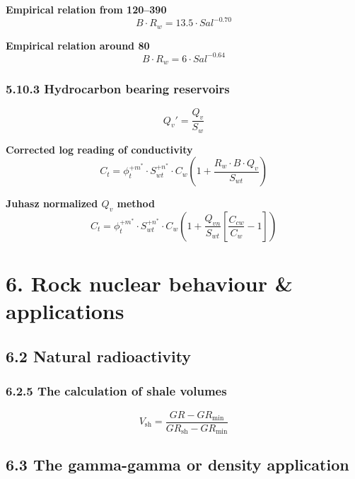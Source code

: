 \textbf{Empirical relation from \SIrange{120}{390}{\fahrenheit}}
\begin{equation*}
    B\cdot R_w = 13.5\cdot \mathit{Sal}^{-0.70}\tag{5.29}
\end{equation*}

\textbf{Empirical relation around \SI{80}{\fahrenheit}}
\begin{equation*}
    B\cdot R_w = 6\cdot \mathit{Sal}^{-0.64}\tag{5.30}
\end{equation*}

\subsubsection{5.10.3 Hydrocarbon bearing reservoirs}
\begin{equation*}
    Q_v' = \frac{Q_v}{S_w}\tag{5.31}
\end{equation*}

\textbf{Corrected log reading of conductivity}
\begin{equation*}
    C_t = \phi_t^{+m^\ast}\cdot S_{wt}^{+n^\ast}\cdot C_w\left( 1 + \frac{R_w\cdot B\cdot Q_v}{S_{wt}} \right)\tag{5.32}
\end{equation*}

\textbf{Juhasz normalized $Q_v$ method}
\begin{equation*}
    C_t = \phi_t^{+m^\ast}\cdot S_{wt}^{+n^\ast}\cdot C_w\left( 1 + \frac{Q_{vn}}{S_{wt}}\left[ \frac{C_{cw}}{C_w} - 1 \right] \right)\tag{5.33}
\end{equation*}

\section{6. Rock nuclear behaviour \& applications}
\subsection{6.2 Natural radioactivity}
\subsubsection{6.2.5 The calculation of shale volumes}
\begin{equation*}
    V_\mathrm{sh} = \frac{\mathit{GR} - \mathit{GR}_\mathrm{min}}{\mathit{GR}_\mathrm{sh} - \mathit{GR}_\mathrm{min}}\tag{6.1}
\end{equation*}

\subsection{6.3 The gamma-gamma or density application}
